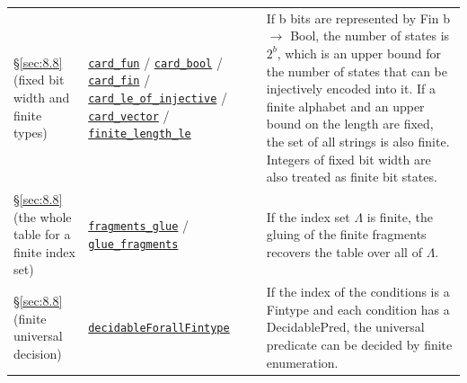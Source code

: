 \begin{xltabular}{\linewidth}{@{}LLL@{}}
\S\ref{sec:8.8} (fixed bit width and finite types) & \href{https://github.com/leanprover-community/mathlib4/blob/8f9d9cff6bd728b17a24e163c9402775d9e6a365/Mathlib/Data/Fintype/BigOperators.lean\#L199}{\texttt{card\_\allowbreak{}fun}} / \href{https://github.com/leanprover-community/mathlib4/blob/8f9d9cff6bd728b17a24e163c9402775d9e6a365/Mathlib/Data/Fintype/Card.lean\#L172}{\texttt{card\_\allowbreak{}bool}} / \href{https://github.com/leanprover-community/mathlib4/blob/8f9d9cff6bd728b17a24e163c9402775d9e6a365/Mathlib/Data/Fintype/Card.lean\#L488}{\texttt{card\_\allowbreak{}fin}} / \href{https://github.com/leanprover-community/mathlib4/blob/8f9d9cff6bd728b17a24e163c9402775d9e6a365/Mathlib/Data/Fintype/Card.lean\#L229}{\texttt{card\_\allowbreak{}le\_\allowbreak{}of\_\allowbreak{}injective}} / \href{https://github.com/leanprover-community/mathlib4/blob/8f9d9cff6bd728b17a24e163c9402775d9e6a365/Mathlib/Data/Fintype/BigOperators.lean\#L204}{\texttt{card\_\allowbreak{}vector}} / \href{https://github.com/leanprover-community/mathlib4/blob/8f9d9cff6bd728b17a24e163c9402775d9e6a365/Mathlib/Data/Set/Finite/List.lean\#L34}{\texttt{finite\_\allowbreak{}length\_\allowbreak{}le}} & If b bits are represented by Fin b $\to$ Bool, the number of states is $2^b$, which is an upper bound for the number of states that can be injectively encoded into it. If a finite alphabet and an upper bound on the length are fixed, the set of all strings is also finite. Integers of fixed bit width are also treated as finite bit states. \\
\addlinespace[3pt]
\S\ref{sec:8.8} (the whole table for a finite index set) & \href{https://github.com/iroha1203/AlgebraicArchitectureTheoryV2/blob/719f81f47d410701fd82c2bc88613cc140c59377/research/lean/ResearchLean/AG/LocalSemanticReconstruction/IndependentFiniteFragments.lean\#L58}{\texttt{fragments\_\allowbreak{}glue}} / \href{https://github.com/iroha1203/AlgebraicArchitectureTheoryV2/blob/719f81f47d410701fd82c2bc88613cc140c59377/research/lean/ResearchLean/AG/LocalSemanticReconstruction/IndependentFiniteFragments.lean\#L55}{\texttt{glue\_\allowbreak{}fragments}} & If the index set $\Lambda$ is finite, the gluing of the finite fragments recovers the table over all of $\Lambda$. \\
\addlinespace[3pt]
\S\ref{sec:8.8} (finite universal decision) & \href{https://github.com/leanprover-community/mathlib4/blob/8f9d9cff6bd728b17a24e163c9402775d9e6a365/Mathlib/Data/Fintype/Defs.lean\#L208}{\texttt{decidable\allowbreak{}Forall\allowbreak{}Fintype}} & If the index of the conditions is a Fintype and each condition has a DecidablePred, the universal predicate can be decided by finite enumeration. \\

\end{xltabular}
